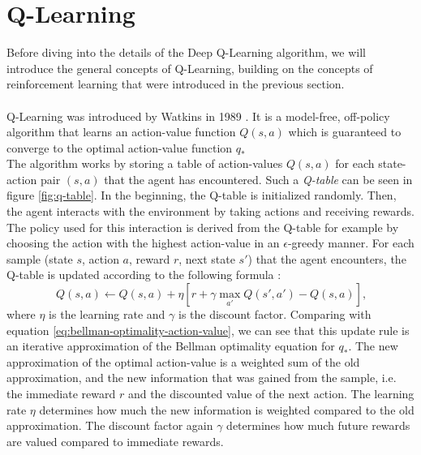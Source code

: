 \section{Q-Learning}
\label{sec:q-learning}
Before diving into the details of the Deep Q-Learning algorithm, we will introduce the general concepts of Q-Learning, building on the concepts of reinforcement learning that were introduced in the previous section.
\\
\\
Q-Learning was introduced by Watkins in 1989 \cite{watkins_learning_1989}. It is a model-free, off-policy algorithm that learns an action-value function $Q(s,a)$ which is guaranteed to converge to the optimal action-value function $q_*$ \cite{watkins_q-learning_1992} \cite[ch. 6.5]{sutton_reinforcement_nodate}
\\
The algorithm works by storing a table of action-values $Q(s,a)$ for each state-action pair $(s,a)$ that the agent has encountered. Such a \textit{Q-table} can be seen in figure \ref{fig:q-table}. In the beginning, the Q-table is initialized randomly. Then, the agent interacts with the environment by taking actions and receiving rewards. The policy used for this interaction is derived from the Q-table for example by choosing the action with the highest action-value in an $\epsilon$-greedy manner. For each sample (state $s$, action $a$, reward $r$, next state $s'$) that the agent encounters, the Q-table is updated according to the following formula \cite[ch. 6.5]{sutton_reinforcement_nodate}:
\begin{equation}
    Q(s, a) \gets Q(s, a) + \eta \left[ r + \gamma \max_{a'} Q(s', a') - Q(s, a) \right] \text{,}
    \label{eq:q-learning-update}
\end{equation}
where $\eta$ is the learning rate and $\gamma$ is the discount factor. Comparing with equation \ref{eq:bellman-optimality-action-value}, we can see that this update rule is an iterative approximation of the Bellman optimality equation for $q_*$. The new approximation of the optimal action-value is a weighted sum of the old approximation, and the new information that was gained from the sample, i.e. the immediate reward $r$ and the discounted value of the next action. The learning rate $\eta$ determines how much the new information is weighted compared to the old approximation. The discount factor again $\gamma$ determines how much future rewards are valued compared to immediate rewards.
\\
\\
